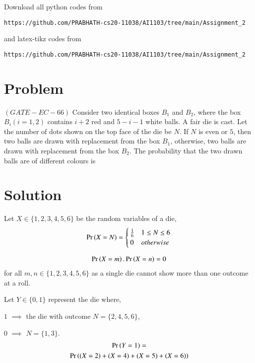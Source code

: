 \documentclass[journal,12pt,twocolumn]{IEEEtran}
\begin{document}
Download all python codes from 
\begin{lstlisting}
https://github.com/PRABHATH-cs20-11038/AI1103/tree/main/Assignment_2
\end{lstlisting}

and latex-tikz codes from
\begin{lstlisting}
https://github.com/PRABHATH-cs20-11038/AI1103/tree/main/Assignment_2
\end{lstlisting}

\section{Problem}

$(GATE-EC-66)$ Consider two identical boxes $B_1$ and $B_2$, where the box $B_i(i = 1, 2)$ contains $i + 2$ red and $5−i−1$ white balls. A fair die is cast. Let the number of dots shown on the top face of the die be $N$. If $N$ is even or $5$, then two balls are drawn with replacement from the box $B_1$, otherwise, two balls are drawn with replacement from the box $B_2$. The probability that the two drawn balls are of different colours is

\section{Solution}

Let $X \in \{1,2,3,4,5,6\}$ be the random variables of a die,
\begin{align}
    \Pr\left(X=N\right) =
    \begin{cases}
    \frac{1}{6} & 1 \leq N \leq 6\\
    0 & otherwise
    \end{cases}
\end{align}

\begin{align}\label{eq1}
    \Pr\left(X=m\right).\Pr\left(X=n\right)=0
\end{align}
for all $m,n \in \{1,2,3,4,5,6\}$ as a single die cannot show more than one outcome at a roll.

\vspace{0.1in}

Let $Y \in \{0, 1\}$ represent the die where,

$1$ $\implies$ the die with outcome $N = \{ 2, 4, 5, 6\}$,

$0$ $\implies$ $N = \{ 1, 3\}$.
\begin{multline}
    \Pr\left(Y=1\right)=\\
    \Pr\left((X=2)+(X=4)+(X=5)+(X=6)\right)
\end{multline}
\end{document}
